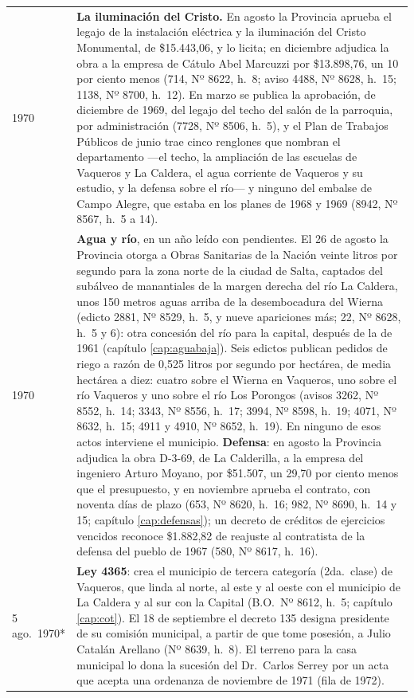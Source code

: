 \begin{longtable}{@{}p{2.7cm}p{10.3cm}@{}}
1970 & \textbf{La iluminación del Cristo.} En agosto la Provincia aprueba el legajo de la instalación eléctrica y la iluminación del Cristo Monumental, de \$15.443,06, y lo licita; en diciembre adjudica la obra a la empresa de Cátulo Abel Marcuzzi por \$13.898,76, un 10 por ciento menos (714, Nº 8622, h.\ 8; aviso 4488, Nº 8628, h.\ 15; 1138, Nº 8700, h.\ 12). En marzo se publica la aprobación, de diciembre de 1969, del legajo del techo del salón de la parroquia, por administración (7728, Nº 8506, h.\ 5), y el Plan de Trabajos Públicos de junio trae cinco renglones que nombran el departamento ---el techo, la ampliación de las escuelas de Vaqueros y La Caldera, el agua corriente de Vaqueros y su estudio, y la defensa sobre el río--- y ninguno del embalse de Campo Alegre, que estaba en los planes de 1968 y 1969 (8942, Nº 8567, h.\ 5 a 14). \\
1970 & \textbf{Agua y río}, en un año leído con pendientes. El 26 de agosto la Provincia otorga a Obras Sanitarias de la Nación veinte litros por segundo para la zona norte de la ciudad de Salta, captados del subálveo de manantiales de la margen derecha del río La Caldera, unos 150 metros aguas arriba de la desembocadura del Wierna (edicto 2881, Nº 8529, h.\ 5, y nueve apariciones más; 22, Nº 8628, h.\ 5 y 6): otra concesión del río para la capital, después de la de 1961 (capítulo \ref{cap:aguabaja}). Seis edictos publican pedidos de riego a razón de 0,525 litros por segundo por hectárea, de media hectárea a diez: cuatro sobre el Wierna en Vaqueros, uno sobre el río Vaqueros y uno sobre el río Los Porongos (avisos 3262, Nº 8552, h.\ 14; 3343, Nº 8556, h.\ 17; 3994, Nº 8598, h.\ 19; 4071, Nº 8632, h.\ 15; 4911 y 4910, Nº 8652, h.\ 19). En ninguno de esos actos interviene el municipio. \textbf{Defensa}: en agosto la Provincia adjudica la obra D-3-69, de La Calderilla, a la empresa del ingeniero Arturo Moyano, por \$51.507, un 29,70 por ciento menos que el presupuesto, y en noviembre aprueba el contrato, con noventa días de plazo (653, Nº 8620, h.\ 16; 982, Nº 8690, h.\ 14 y 15; capítulo \ref{cap:defensas}); un decreto de créditos de ejercicios vencidos reconoce \$1.882,82 de reajuste al contratista de la defensa del pueblo de 1967 (580, Nº 8617, h.\ 16). \\
5 ago.\ 1970* & \textbf{Ley 4365}: crea el municipio de tercera categoría (2da.\ clase) de Vaqueros, que linda al norte, al este y al oeste con el municipio de La Caldera y al sur con la Capital (B.O.\ Nº 8612, h.\ 5; capítulo \ref{cap:cot}). El 18 de septiembre el decreto 135 designa presidente de su comisión municipal, a partir de que tome posesión, a Julio Catalán Arellano (Nº 8639, h.\ 8). El terreno para la casa municipal lo dona la sucesión del Dr.\ Carlos Serrey\index{Serrey, Carlos} por un acta que acepta una ordenanza de noviembre de 1971 (fila de 1972). \\

\end{longtable}
